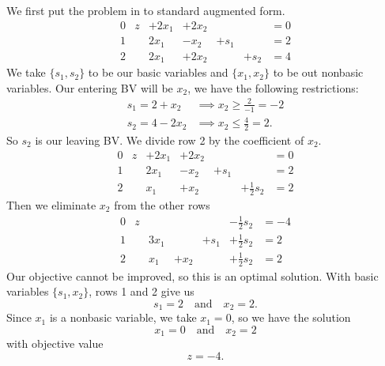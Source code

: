 \documentclass[12pt]{article}
\theoremstyle{definition}
\newcommand{\isp}[1]{\quad\text{#1}\quad}
\begin{document}
We first put the problem in to standard augmented form.
\[\begin{array}{rrrrrrl}
    0 & z & +2x_1 & + 2x_2 & & & = 0\\
    1 &   & 2x_1 & -x_2 & +s_1 & & = 2 \\
    2 &   & 2x_1 & +2x_2 & & +s_2 & = 4
\end{array}\]
We take $\{s_1, s_2\}$ to be our basic variables and $\{x_1, x_2\}$ to be out nonbasic variables. Our entering BV will be $x_2$, we have the following restrictions:
\begin{align*}
    s_1 = 2 + x_2 &\implies x_2 \geq \frac{2}{-1} = -2 \\
    s_2 = 4 - 2x_2 &\implies x_2 \leq \frac{4}{2} = 2.
\end{align*}
So $s_2$ is our leaving BV. We divide row 2 by the coefficient of $x_2$.
\[\begin{array}{rrrrrrl}
    0 & z & +2x_1 & + 2x_2 & & & = 0\\
    1 &   & 2x_1 & -x_2 & +s_1 & & = 2 \\
    2 &   & x_1 & +x_2 & & +\frac{1}{2}s_2 & = 2
\end{array}\]
Then we eliminate $x_2$ from the other rows
\[\begin{array}{rrrrrrl}
    0 & z &  &  & & -\frac{1}{2}s_2 & = -4\\
    1 &   & 3x_1 &  & +s_1 & +\frac{1}{2}s_2 & = 2 \\
    2 &   & x_1 & +x_2 & & +\frac{1}{2}s_2 & = 2
\end{array}\]
Our objective cannot be improved, so this is an optimal solution. With basic variables $\{s_1, x_2\}$, rows 1 and 2 give us
\[
    s_1 = 2 \isp{and} x_2 = 2.
\]
Since $x_1$ is a nonbasic variable, we take $x_1 = 0$, so we have the solution
\[
    x_1 = 0 \isp{and} x_2 = 2
\]
with objective value
\[
    z = -4.
\]
\end{document}
